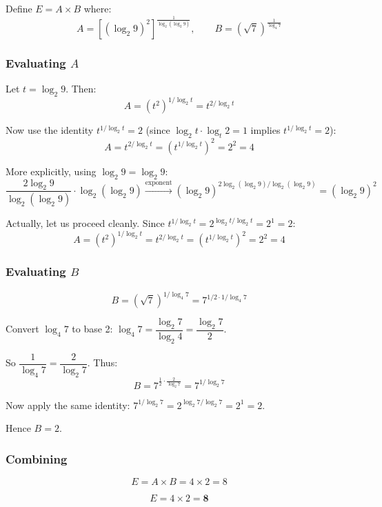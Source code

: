 \documentclass[12pt]{article}
\begin{document}
Define $E = A \times B$ where:
\[
A = \left[(\log_2 9)^2\right]^{\!\frac{1}{\log_2(\log_2 9)}}, \qquad
B = \left(\sqrt{7}\right)^{\!\frac{1}{\log_4 7}}
\]

\subsubsection*{Evaluating $A$}

Let $t = \log_2 9$. Then:
\[
A = (t^2)^{1/\log_2 t} = t^{2/\log_2 t}
\]

Now use the identity $t^{1/\log_2 t} = 2$ (since $\log_2 t \cdot \log_t 2 = 1$ implies $t^{1/\log_2 t} = 2$):
\[
A = t^{2/\log_2 t} = \left(t^{1/\log_2 t}\right)^2 = 2^2 = 4
\]

More explicitly, using $\log_2 9 = \log_2 9$:
\[
\frac{2 \log_2 9}{\log_2(\log_2 9)} \cdot \log_2(\log_2 9) \xrightarrow{\text{exponent}} (\log_2 9)^{2\log_2(\log_2 9)/\log_2(\log_2 9)} = (\log_2 9)^2
\]

\noindent Actually, let us proceed cleanly. Since $t^{1/\log_2 t} = 2^{\log_2 t / \log_2 t} = 2^1 = 2$:
\[
A = \left(t^2\right)^{1/\log_2 t} = t^{2/\log_2 t} = \left(t^{1/\log_2 t}\right)^2 = 2^2 = 4
\]

\subsubsection*{Evaluating $B$}

\[
B = (\sqrt{7})^{1/\log_4 7} = 7^{1/2 \cdot 1/\log_4 7}
\]

Convert $\log_4 7$ to base 2: $\log_4 7 = \dfrac{\log_2 7}{\log_2 4} = \dfrac{\log_2 7}{2}$.

So $\dfrac{1}{\log_4 7} = \dfrac{2}{\log_2 7}$. Thus:
\[
B = 7^{\frac{1}{2} \cdot \frac{2}{\log_2 7}} = 7^{1/\log_2 7}
\]

Now apply the same identity: $7^{1/\log_2 7} = 2^{\log_2 7/\log_2 7} = 2^1 = 2$.

Hence $B = 2$.

\subsubsection*{Combining}

\[
E = A \times B = 4 \times 2 = \boxed{8}
\]

\begin{answerbox}
\[E = 4 \times 2 = \mathbf{8}\]
\end{answerbox}
\end{document}

